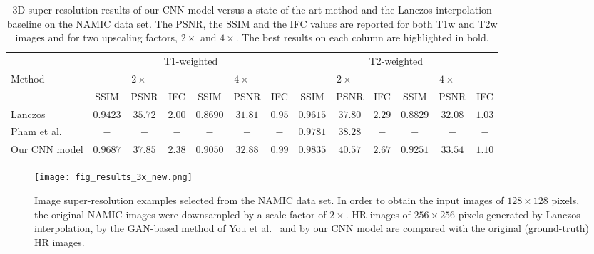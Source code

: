 \documentclass{ieeeaccess}
\begin{document}
\begin{table*}[!t]
\caption{3D super-resolution results of our CNN model versus a state-of-the-art method \cite{Pham-CMIG-2019} and the Lanczos interpolation baseline on the NAMIC data set. The PSNR, the SSIM and the IFC values are reported for both T1w and T2w images and for two upscaling factors, $2\times$ and $4\times$. The best results on each column are highlighted in bold.}\label{tab_namic_results_3D}
\begin{center}
\begin{tabular}{|l|c|c|c|c|c|c|c|c|c|c|c|c|}
\hline 
  & \multicolumn{6}{|c|}{T1-weighted} & \multicolumn{6}{|c|}{T2-weighted} \\
\cline{2-13}
Method        & \multicolumn{3}{|c|}{$2\times$} & \multicolumn{3}{|c|}{$4\times$} & \multicolumn{3}{|c|}{$2\times$} & \multicolumn{3}{|c|}{$4\times$} \\
\cline{2-13}   												& SSIM         & PSNR      & IFC			& SSIM        & PSNR & IFC    & SSIM           & PSNR & IFC          & SSIM           & PSNR & IFC\\
\hline  
\hline   
Lanczos               								& $0.9423$ & $35.72$ & $2.00$ & $0.8690$ & $31.81$ & $0.95$ & $0.9615$ & $37.80$ & $2.29$ & $0.8829$ & $32.08$ & $1.03$\\
\hline
Pham et al.~\cite{Pham-CMIG-2019}  & $-$  & $-$ & $-$  & $-$ & $-$  & $-$   & $0.9781$ & $38.28$ & $-$  & $-$ & $-$ & $-$\\
\hline 
Our CNN model            						& $\mathbf{0.9687}$ & $\mathbf{37.85}$ & $\mathbf{2.38}$ & $\mathbf{0.9050}$ & $\mathbf{32.88}$ & $\mathbf{0.99}$ & $\mathbf{0.9835}$ & $\mathbf{40.57}$ & $\mathbf{2.67}$ & $\mathbf{0.9251}$ & $\mathbf{33.54}$ & $\mathbf{1.10}$\\ 
\hline 
\end{tabular}
\end{center}
\end{table*}

\begin{figure*}[t!]
\centering
\texttt{[image: fig\_results\_3x\_new.png]}
\caption{Image super-resolution examples selected from the NAMIC data set. In order to obtain the input images of $128 \times 128$ pixels, the original NAMIC images were downsampled by a scale factor of $2\times$. HR images of $256 \times 256$ pixels generated by Lanczos interpolation, by the GAN-based method of You et al.~\cite{You-TMI-2019} and by our CNN model are compared with the original (ground-truth) HR images.}
\label{fig_namic_results}
\end{figure*}
\end{document}
